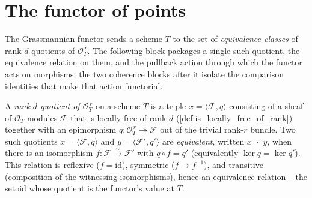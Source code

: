 \section{The functor of points}
\label{sec:grquot_functor}

The Grassmannian functor sends a scheme \(T\) to the set of \emph{equivalence classes} of
rank-\(d\) quotients of \(\mathcal{O}_T^{\,r}\). The following block packages a single such
quotient, the equivalence relation on them, and the pullback action through which the
functor acts on morphisms; the two coherence blocks after it isolate the comparison
identities that make that action functorial.

\begin{definition}
  \label{def:gr_rankQuotient}
  A \emph{rank-\(d\) quotient of \(\mathcal{O}_T^{\,r}\)} on a scheme \(T\) is a triple
  \(x = \langle \mathcal{F}, q \rangle\) consisting of a sheaf of \(\mathcal{O}_T\)-modules
  \(\mathcal{F}\) that is locally free of rank \(d\) (\cref{def:is_locally_free_of_rank})
  together with an epimorphism \(q : \mathcal{O}_T^{\,r} \twoheadrightarrow \mathcal{F}\) out
  of the trivial rank-\(r\) bundle. Two such quotients \(x = \langle \mathcal{F}, q\rangle\)
  and \(y = \langle \mathcal{F}', q'\rangle\) are \emph{equivalent}, written \(x \sim y\),
  when there is an isomorphism \(f : \mathcal{F} \xrightarrow{\sim} \mathcal{F}'\) with
  \(q \circ f = q'\) (equivalently \(\ker q = \ker q'\)). This relation is reflexive
  (\(f = \mathrm{id}\)), symmetric (\(f \mapsto f^{-1}\)), and transitive (composition of the
  witnessing isomorphisms), hence an equivalence relation -- the setoid whose quotient is the
  functor's value at \(T\).


\end{definition}
